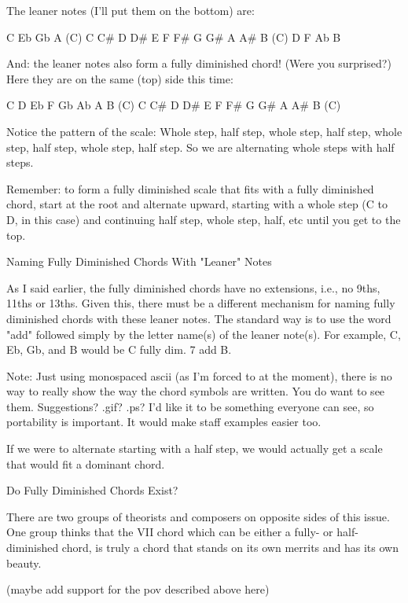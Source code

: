 The leaner notes (I'll put them on the bottom) are:

C              Eb             Gb             A              (C)
C    C\#   D    D\#   E    F    F\#   G    G\#   A    A\#   B    (C)
          D              F              Ab             B

And: the leaner notes also form a fully diminished chord! (Were you surprised?)
Here they are on the same (top) side this time:

C         D    Eb        F    Gb        Ab   A         B    (C)
C    C\#   D    D\#   E    F    F\#   G    G\#   A    A\#   B    (C)

Notice the pattern of the scale: Whole step, half step, whole step, half step,
whole step, half step, whole step, half step. So we are alternating whole steps
with half steps.

Remember: to form a fully diminished scale that fits with a fully diminished
chord, start at the root and alternate upward, starting with a whole step (C
to D, in this case) and continuing half step, whole step, half, etc until you
get to the top.

Naming Fully Diminished Chords With "Leaner" Notes

As I said earlier, the fully diminished chords have no extensions, i.e., no
9ths, 11ths or 13ths. Given this, there must be a different mechanism for
naming fully diminished chords with these leaner notes. The standard way
is to use the word "add" followed simply by the letter name(s) of the leaner
note(s). For example, C, Eb, Gb, and B would be C fully dim. 7 add B.

Note: Just using monospaced ascii (as I'm forced to at the moment), there is
no way to really show the way the chord symbols are written. You do want to
see them. Suggestions? .gif? .ps? I'd like it to be something everyone can
see, so portability is important. It would make staff examples easier too.

If we were to alternate starting with a half step, we would actually get a
scale that would fit a dominant chord.

Do Fully Diminished Chords Exist?

There are two groups of theorists and composers on opposite sides of this
issue. One group thinks that the VII chord which can be either a fully- or
half-diminished chord, is truly a chord that stands on its own merrits and
has its own beauty.

(maybe add support for the pov described above here)

